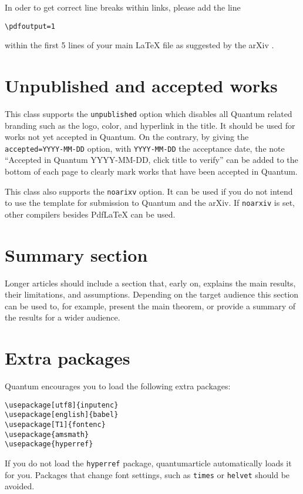 \documentclass[a4paper,twocolumn,superscriptaddress,11pt,accepted=2017-05-09]{quantumarticle}
\begin{document}
In oder to get correct line breaks within links, please add the line 
\begin{verbatim}
\pdfoutput=1
\end{verbatim}
within the first 5 lines of your main LaTeX file as suggested by the arXiv \cite{arxivpdfoutput}.

\section{Unpublished and accepted works}
This class supports the \texttt{unpublished} option which disables all Quantum related branding such as the logo, color, and hyperlink in the title. It should be used for works not yet accepted in Quantum.
On the contrary, by giving the \texttt{accepted=YYYY-MM-DD} option, with \texttt{YYYY-MM-DD} the acceptance date, the note ``Accepted in Quantum YYYY-MM-DD, click title to verify'' can be added to the bottom of each page to clearly mark works that have been accepted in Quantum. 

This class also supports the \texttt{noarixv} option. It can be used if you do not intend to use the template for submission to Quantum and the arXiv. If \texttt{noarxiv} is set, other compilers besides PdfLaTeX can be used.

\section{Summary section}
Longer articles should include a section that, early on, explains the main results, their limitations, and assumptions.
Depending on the target audience this section can be used to, for example, present the main theorem, or provide a summary of the results for a wider audience.

\section{Extra packages}
Quantum encourages you to load the following extra packages:
\begin{verbatim}
\usepackage[utf8]{inputenc}
\usepackage[english]{babel}
\usepackage[T1]{fontenc}
\usepackage{amsmath}
\usepackage{hyperref}
\end{verbatim}
If you do not load the \texttt{hyperref} package, quantumarticle automatically loads it for you.
Packages that change font settings, such as \texttt{times} or \texttt{helvet} should be avoided.
\end{document}
